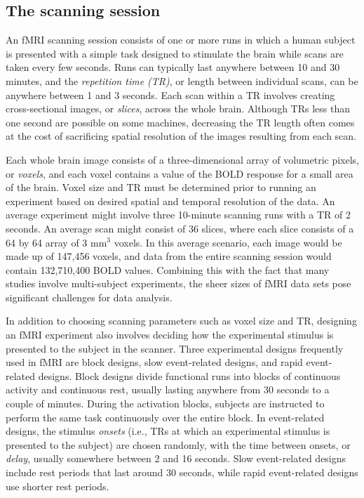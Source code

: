 \subsection{The scanning session \label{sec:fmri:scan}}

An fMRI scanning session consists of one or more runs in which a human subject is presented with a simple task designed to stimulate the brain while scans are taken every few seconds. Runs can typically last anywhere between 10 and 30 minutes, and the \emph{repetition time (TR)}, or length between individual scans, can be anywhere between 1 and 3 seconds. Each scan within a TR involves creating cross-sectional images, or \emph{slices}, across the whole brain. Although TRs less than one second are possible on some machines, decreasing the TR length often comes at the cost of sacrificing spatial resolution of the images resulting from each scan.

Each whole brain image consists of a three-dimensional array of volumetric pixels, or \emph{voxels}, and each voxel contains a value of the BOLD response for a small area of the brain. Voxel size and TR must be determined prior to running an experiment based on desired spatial and temporal resolution of the data. An average experiment might involve three 10-minute scanning runs with a TR of 2 seconds. An average scan might consist of 36 slices, where each slice consists of a 64 by 64 array of 3 $\mbox{mm}^3$ voxels. In this average scenario, each image would be made up of 147,456 voxels, and data from the entire scanning session would contain 132,710,400 BOLD values. Combining this with the fact that many studies involve multi-subject experiments, the sheer sizes of fMRI data sets pose significant challenges for data analysis.

In addition to choosing scanning parameters such as voxel size and TR, designing an fMRI experiment also involves deciding how the experimental stimulus is presented to the subject in the scanner. Three experimental designs frequently used in fMRI are block designs, slow event-related designs, and rapid event-related designs. Block designs divide functional runs into blocks of continuous activity and continuous rest, usually lasting anywhere from 30 seconds to a couple of minutes. During the activation blocks, subjects are instructed to perform the same task continuously over the entire block. In event-related designs, the stimulus \emph{onsets} (i.e., TRs at which an experimental stimulus is presented to the subject) are chosen randomly, with the time between onsets, or \emph{delay}, usually somewhere between 2 and 16 seconds. Slow event-related designs include rest periods that last around 30 seconds, while rapid event-related designs use shorter rest periods.

